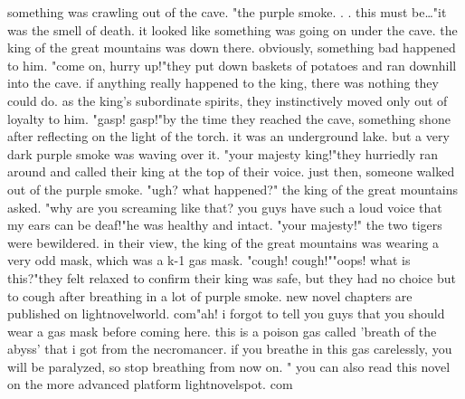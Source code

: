 something was crawling out of the cave.
"the purple smoke.
.
.
this must be…"it was the smell of death.
 it looked like something was going on under the cave.
 the king of the great mountains was down there.
 obviously, something bad happened to him.
"come on, hurry up!"they put down baskets of potatoes and ran downhill into the cave.
if anything really happened to the king, there was nothing they could do.
 as the king's subordinate spirits, they instinctively moved only out of loyalty to him.
"gasp! gasp!"by the time they reached the cave, something shone after reflecting on the light of the torch.
 it was an underground lake.
 but a very dark purple smoke was waving over it.
"your majesty king!"they hurriedly ran around and called their king at the top of their voice.
 just then, someone walked out of the purple smoke.
"ugh? what happened?" the king of the great mountains asked.
 "why are you screaming like that? you guys have such a loud voice that my ears can be deaf!"he was healthy and intact.
 "your majesty!" the two tigers were bewildered.
 in their view, the king of the great mountains was wearing a very odd mask, which was a k-1 gas mask.
"cough! cough!""oops! what is this?"they felt relaxed to confirm their king was safe, but they had no choice but to cough after breathing in a lot of purple smoke.
new novel chapters are published on lightnov­elworld.
com"ah! i forgot to tell you guys that you should wear a gas mask before coming here.
 this is a poison gas called 'breath of the abyss' that i got from the necromancer.
 if you breathe in this gas carelessly, you will be paralyzed, so stop breathing from now on.
" you can also read this novel on the more advanced platform lightnovelspot.
com

 